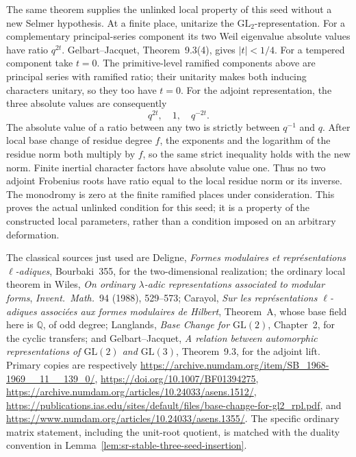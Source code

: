 The same theorem supplies the unlinked local property of this
seed without a new Selmer hypothesis.
At a finite place, unitarize the \(\mathrm{GL}_2\)-representation.
For a complementary principal-series component its two
Weil eigenvalue absolute values have ratio \(q^{2t}\).
Gelbart--Jacquet, Theorem~9.3(4), gives \(|t|<1/4\).
For a tempered component take \(t=0\).
The primitive-level ramified components above are principal
series with ramified ratio; their unitarity makes both
inducing characters unitary, so they too have \(t=0\).
For the adjoint representation, the three absolute values
are consequently
\[
                              q^{2t},\quad1,\quad q^{-2t}.
\]
The absolute value of a ratio between any two is strictly
between \(q^{-1}\) and \(q\).
After local base change of residue degree \(f\), the exponents
and the logarithm of the residue norm both multiply by \(f\),
so the same strict inequality holds with the new norm.
Finite inertial character factors have absolute value one.
Thus no two adjoint Frobenius roots have ratio equal to the
local residue norm or its inverse.
The monodromy is zero at the finite ramified places under
consideration.
This proves the actual unlinked condition for this seed;
it is a property of the constructed local parameters,
rather than a condition imposed on an arbitrary deformation.

The classical sources just used are Deligne,
\emph{Formes modulaires et repr\'esentations \(\ell\)-adiques},
Bourbaki~355, for the two-dimensional realization;
the ordinary local theorem in Wiles,
\emph{On ordinary \(\lambda\)-adic representations associated
to modular forms}, \emph{Invent.\ Math.}~94 (1988), 529--573;
Carayol, \emph{Sur les repr\'esentations \(\ell\)-adiques
associ\'ees aux formes modulaires de Hilbert}, Theorem~A,
whose base field here is \(\mathbb Q\), of odd degree;
Langlands, \emph{Base Change for \(\mathrm{GL}(2)\)},
Chapter~2, for the cyclic transfers;
and Gelbart--Jacquet, \emph{A relation between automorphic
representations of \(\mathrm{GL}(2)\) and \(\mathrm{GL}(3)\)},
Theorem~9.3, for the adjoint lift.
Primary copies are respectively
\url{https://archive.numdam.org/item/SB_1968-1969__11__139_0/},
\url{https://doi.org/10.1007/BF01394275},
\url{https://archive.numdam.org/articles/10.24033/asens.1512/},
\url{https://publications.ias.edu/sites/default/files/base-change-for-gl2_rpl.pdf},
and
\url{https://www.numdam.org/articles/10.24033/asens.1355/}.
The specific ordinary matrix statement, including the
unit-root quotient, is matched with the duality convention
in Lemma~\ref{lem:sr-stable-three-seed-insertion}.

